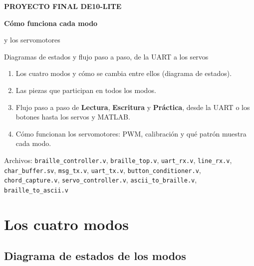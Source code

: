 \documentclass[11pt,a4paper]{article}
\newcommand{\cod}[1]{\texttt{#1}}
\begin{document}
\begin{titlepage}
\centering
\vspace*{3cm}
{\color{verde}\large\bfseries PROYECTO FINAL \textendash{} DE10-LITE\par}
\vspace{0.7cm}
{\color{tinta}\Huge\bfseries Cómo funciona cada modo\par}
\vspace{0.3cm}
{\color{tinta}\LARGE y los servomotores\par}
\vspace{0.7cm}
{\large\color{gris}Diagramas de estados y flujo paso a paso, de la UART a los servos\par}
\vspace{1.6cm}
\begin{minipage}{0.8\textwidth}
\begin{idea}[Contenido]
\begin{enumerate}[leftmargin=*]
  \item Los cuatro modos y cómo se cambia entre ellos (diagrama de estados).
  \item Las piezas que participan en todos los modos.
  \item Flujo paso a paso de \textbf{Lectura}, \textbf{Escritura} y \textbf{Práctica},
        desde la UART o los botones hasta los servos y MATLAB.
  \item Cómo funcionan los servomotores: PWM, calibración y qué patrón muestra cada modo.
\end{enumerate}
\end{idea}
\end{minipage}
\vfill
{\color{gris}Archivos: \cod{braille\_controller.v}, \cod{braille\_top.v}, \cod{uart\_rx.v}, \cod{line\_rx.v},
\cod{char\_buffer.sv}, \cod{msg\_tx.v}, \cod{uart\_tx.v}, \cod{button\_conditioner.v}, \cod{chord\_capture.v},
\cod{servo\_controller.v}, \cod{ascii\_to\_braille.v}, \cod{braille\_to\_ascii.v}\par}
\end{titlepage}

\tableofcontents
\newpage

\section{Los cuatro modos}

\subsection{Diagrama de estados de los modos}
\end{document}
